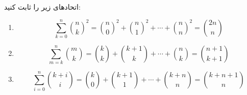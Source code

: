 \EXERCISE
اتحادهای زیر را ثابت کنید:
\begin{enumerate}
\item
$$\sum_{k=0}^{n} {\binom n k}^2 = {\binom n 0}^2 + {\binom n 1}^2 + \cdots + {\binom n n}^2 = \binom{2n}{n}$$
\item
$$\sum_{m=k}^{n} \binom m k = \binom k k + \binom{k+1}{k} + \cdots + \binom n k = \binom{n+1}{k+1}$$
\item
$$\sum_{i=0}^{n} \binom{k+i}{i} = \binom k 0 + \binom{k+1}{1} + \cdots + \binom{k+n}{n} = \binom{k + n + 1}{n}$$
\end{enumerate}